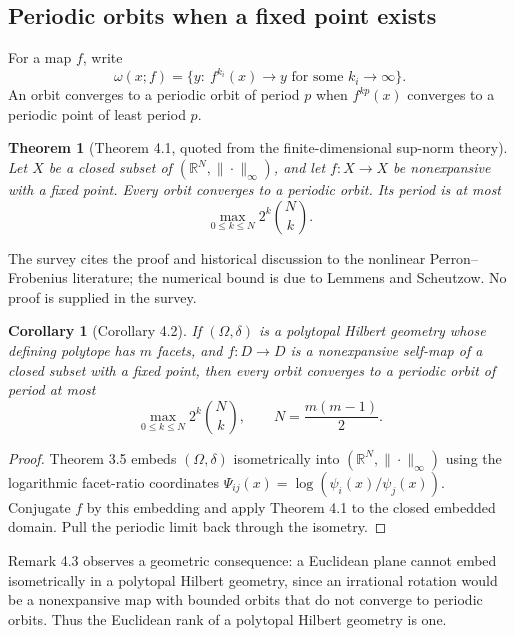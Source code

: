 \documentclass[11pt]{article}
\newtheorem{theorem}{Theorem}
\newtheorem{corollary}{Corollary}
\newcommand{\R}{\mathbb{R}}
\begin{document}
\subsection{Periodic orbits when a fixed point exists}
For a map \(f\), write
\[
 \omega(x;f)=\{y:\ f^{k_i}(x)\to y\text{ for some }k_i\to\infty\}.
\]
An orbit converges to a periodic orbit of period \(p\) when \(f^{kp}(x)\) converges to a periodic
point of least period \(p\).

\begin{theorem}[Theorem 4.1, quoted from the finite-dimensional sup-norm theory]
Let \(X\) be a closed subset of \((\R^N,\|\cdot\|_\infty)\), and let
\(f:X\to X\) be nonexpansive with a fixed point.  Every orbit converges to a periodic orbit.  Its
period is at most
\[
 \max_{0\le k\le N}2^k\binom Nk.
\]
\end{theorem}
The survey cites the proof and historical discussion to the nonlinear Perron--Frobenius literature;
the numerical bound is due to Lemmens and Scheutzow.  No proof is supplied in the survey.

\begin{corollary}[Corollary 4.2]
If \((\Omega,\delta)\) is a polytopal Hilbert geometry whose defining polytope has \(m\) facets,
and \(f:D\to D\) is a nonexpansive self-map of a closed subset with a fixed point, then every orbit
converges to a periodic orbit of period at most
\[
 \max_{0\le k\le N}2^k\binom Nk,
 \qquad N=\frac{m(m-1)}2.
\]
\end{corollary}
\begin{proof}
Theorem 3.5 embeds \((\Omega,\delta)\) isometrically into
\((\R^N,\|\cdot\|_\infty)\) using the logarithmic facet-ratio coordinates
\(\Psi_{ij}(x)=\log(\psi_i(x)/\psi_j(x))\).  Conjugate \(f\) by this embedding and apply Theorem
4.1 to the closed embedded domain.  Pull the periodic limit back through the isometry.
\end{proof}

Remark 4.3 observes a geometric consequence: a Euclidean plane cannot embed isometrically in a
polytopal Hilbert geometry, since an irrational rotation would be a nonexpansive map with bounded
orbits that do not converge to periodic orbits.  Thus the Euclidean rank of a polytopal Hilbert
geometry is one.
\end{document}
